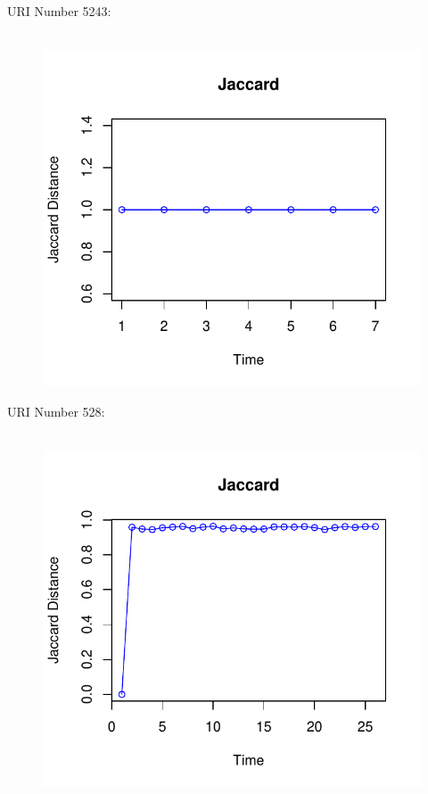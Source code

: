 \documentclass[12pt]{article}
\begin{document}
URI Number 5243:\\
\begin{figure}[H]
    \centering
    \includegraphics[scale=0.7]{5243.pdf}
\end{figure}

URI Number 528:\\
\begin{figure}[H]
    \centering
    \includegraphics[scale=0.7]{528.pdf}
\end{figure}
\end{document}
